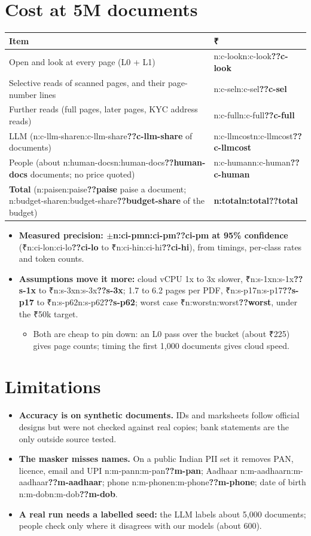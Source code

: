 \documentclass[9pt]{extarticle}
\newcommand\N[1]{\ifcsname n:#1\endcsname\csname n:#1\endcsname\else\textbf{??#1}\fi}
\newcommand\R{₹}
\newcommand\hdr{\rowcolor{nfill}}
\begin{document}
\section{Cost at 5M documents}
\vspace{1pt}
\begin{tabularx}{\linewidth}{|L|R{2.2cm}|}
\hline
\hdr\textbf{Item} & \textbf{\R} \\ \hline
Open and look at every page (L0 + L1) & \N{c-look} \\ \hline
Selective reads of scanned pages, and their page-number lines & \N{c-sel} \\ \hline
Further reads (full pages, later pages, KYC address reads) & \N{c-full} \\ \hline
LLM (\N{c-llm-share} of documents) & \N{c-llmcost} \\ \hline
People (about \N{human-docs} documents; no price quoted) & \N{c-human} \\ \hline
\hdr\textbf{Total} (\N{paise} paise a document; \N{budget-share} of the budget) & \textbf{\N{total}} \\ \hline
\end{tabularx}
\vspace{2pt}
\begin{itemize}
\item \textbf{Measured precision: $\pm$\N{ci-pm} at 95\% confidence} (\R\N{ci-lo} to \R\N{ci-hi}), from timings, per-class rates and token counts.
\item \textbf{Assumptions move it more:} cloud vCPU 1x to 3x slower, \R\N{s-1x} to \R\N{s-3x}; 1.7 to 6.2 pages per PDF, \R\N{s-p17} to \R\N{s-p62}; worst case \R\N{worst}, under the \R50k target.
  \begin{itemize}
  \item Both are cheap to pin down: an L0 pass over the bucket (about \R225) gives page counts; timing the first 1,000 documents gives cloud speed.
  \end{itemize}
\end{itemize}

\section{Limitations}
\begin{itemize}
\item \textbf{Accuracy is on synthetic documents.} IDs and marksheets follow official designs but were not checked against real copies; bank statements are the only outside source tested.
\item \textbf{The masker misses names.} On a public Indian PII set it removes PAN, licence, email and UPI \N{m-pan}; Aadhaar \N{m-aadhaar}; phone \N{m-phone}; date of birth \N{m-dob}.
\item \textbf{A real run needs a labelled seed:} the LLM labels about 5,000 documents; people check only where it disagrees with our models (about 600).
\end{itemize}
\end{document}
